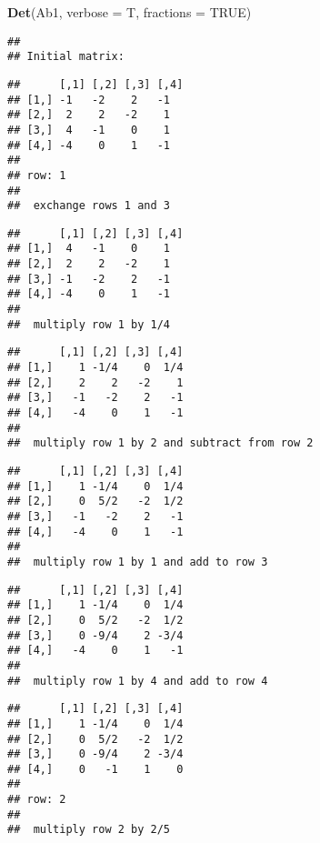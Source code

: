 \documentclass[
  10pt,
  a4paper,
]{article}
\newenvironment{Shaded}{\begin{snugshade}}{\end{snugshade}}
\newcommand{\AttributeTok}[1]{\textcolor[rgb]{0.13,0.29,0.53}{#1}}
\newcommand{\ConstantTok}[1]{\textcolor[rgb]{0.56,0.35,0.01}{#1}}
\newcommand{\FunctionTok}[1]{\textcolor[rgb]{0.13,0.29,0.53}{\textbf{#1}}}
\newcommand{\NormalTok}[1]{#1}
\begin{document}
\begin{Shaded}
\begin{Highlighting}[]
\FunctionTok{Det}\NormalTok{(Ab1, }\AttributeTok{verbose =}\NormalTok{ T, }\AttributeTok{fractions =} \ConstantTok{TRUE}\NormalTok{)}
\end{Highlighting}
\end{Shaded}

\begin{verbatim}
## 
## Initial matrix:
\end{verbatim}

\begin{verbatim}
##      [,1] [,2] [,3] [,4]
## [1,] -1   -2    2   -1  
## [2,]  2    2   -2    1  
## [3,]  4   -1    0    1  
## [4,] -4    0    1   -1  
## 
## row: 1 
## 
##  exchange rows 1 and 3
\end{verbatim}

\begin{verbatim}
##      [,1] [,2] [,3] [,4]
## [1,]  4   -1    0    1  
## [2,]  2    2   -2    1  
## [3,] -1   -2    2   -1  
## [4,] -4    0    1   -1  
## 
##  multiply row 1 by 1/4
\end{verbatim}

\begin{verbatim}
##      [,1] [,2] [,3] [,4]
## [1,]    1 -1/4    0  1/4
## [2,]    2    2   -2    1
## [3,]   -1   -2    2   -1
## [4,]   -4    0    1   -1
## 
##  multiply row 1 by 2 and subtract from row 2
\end{verbatim}

\begin{verbatim}
##      [,1] [,2] [,3] [,4]
## [1,]    1 -1/4    0  1/4
## [2,]    0  5/2   -2  1/2
## [3,]   -1   -2    2   -1
## [4,]   -4    0    1   -1
## 
##  multiply row 1 by 1 and add to row 3
\end{verbatim}

\begin{verbatim}
##      [,1] [,2] [,3] [,4]
## [1,]    1 -1/4    0  1/4
## [2,]    0  5/2   -2  1/2
## [3,]    0 -9/4    2 -3/4
## [4,]   -4    0    1   -1
## 
##  multiply row 1 by 4 and add to row 4
\end{verbatim}

\begin{verbatim}
##      [,1] [,2] [,3] [,4]
## [1,]    1 -1/4    0  1/4
## [2,]    0  5/2   -2  1/2
## [3,]    0 -9/4    2 -3/4
## [4,]    0   -1    1    0
## 
## row: 2 
## 
##  multiply row 2 by 2/5
\end{verbatim}
\end{document}
